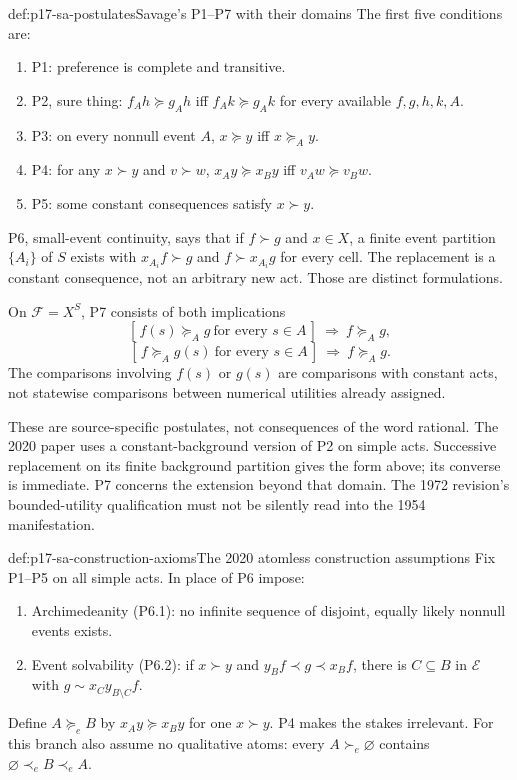 \begin{hbdefinition}{def:p17-sa-postulates}{Savage's P1--P7 with their domains}
The first five conditions are:
\begin{enumerate}
\item P1: preference is complete and transitive.
\item P2, sure thing:
\(f_Ah\succeq g_Ah\) iff \(f_Ak\succeq g_Ak\)
for every available \(f,g,h,k,A\).
\item P3: on every nonnull event \(A\),
\(x\succeq y\) iff \(x\succeq_Ay\).
\item P4: for any \(x\succ y\) and \(v\succ w\),
\(x_Ay\succeq x_By\) iff \(v_Aw\succeq v_Bw\).
\item P5: some constant consequences satisfy \(x\succ y\).
\end{enumerate}
P6, small-event continuity, says that if \(f\succ g\)
and \(x\in X\), a finite event partition \(\{A_i\}\) of
\(S\) exists with \(x_{A_i}f\succ g\) and
\(f\succ x_{A_i}g\) for every cell.
The replacement is a constant consequence, not an arbitrary
new act. Those are distinct formulations.

On \(\mathcal F=X^S\), P7 consists of both implications
\[
 [\,f(s)\succeq_Ag\ \text{for every }s\in A\,]
       \ \Longrightarrow\ f\succeq_Ag,
\]
\[
 [\,f\succeq_Ag(s)\ \text{for every }s\in A\,]
       \ \Longrightarrow\ f\succeq_Ag.
\]
The comparisons involving \(f(s)\) or \(g(s)\) are comparisons
with constant acts, not statewise comparisons between numerical
utilities already assigned.
\end{hbdefinition}

These are source-specific postulates, not consequences of the
word rational. The 2020 paper uses a constant-background
version of P2 on simple acts. Successive replacement on its
finite background partition gives the form above; its converse
is immediate. P7 concerns the extension beyond that domain.
The 1972 revision's bounded-utility qualification must not be
silently read into the 1954 manifestation.

\begin{hbdefinition}{def:p17-sa-construction-axioms}{The 2020 atomless construction assumptions}
Fix P1--P5 on all simple acts. In place of P6 impose:
\begin{enumerate}
\item Archimedeanity (P6.1): no infinite sequence of disjoint,
equally likely nonnull events exists.
\item Event solvability (P6.2): if \(x\succ y\) and
\(y_Bf\prec g\prec x_Bf\), there is \(C\subseteq B\)
in \(\mathcal E\) with
\(g\sim x_Cy_{B\setminus C}f\).
\end{enumerate}
Define \(A\succeq_eB\) by \(x_Ay\succeq x_By\)
for one \(x\succ y\). P4 makes the stakes irrelevant.
For this branch also assume no qualitative atoms:
every \(A\succ_e\varnothing\) contains
\(\varnothing\prec_e B\prec_e A\).
\end{hbdefinition}

